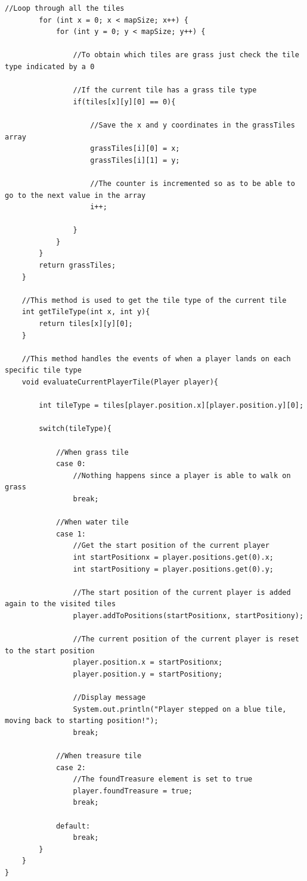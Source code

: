 \documentclass[a4paper,12pt]{extarticle}
\begin{document}
\begin{lstlisting}[caption=The initial code of the Map class]
        //Loop through all the tiles
        for (int x = 0; x < mapSize; x++) {
            for (int y = 0; y < mapSize; y++) {

                //To obtain which tiles are grass just check the tile type indicated by a 0

                //If the current tile has a grass tile type
                if(tiles[x][y][0] == 0){

                    //Save the x and y coordinates in the grassTiles array
                    grassTiles[i][0] = x;
                    grassTiles[i][1] = y;

                    //The counter is incremented so as to be able to go to the next value in the array
                    i++;

                }
            }
        }
        return grassTiles;
    }

    //This method is used to get the tile type of the current tile
    int getTileType(int x, int y){
        return tiles[x][y][0];
    }

    //This method handles the events of when a player lands on each specific tile type
    void evaluateCurrentPlayerTile(Player player){

        int tileType = tiles[player.position.x][player.position.y][0];

        switch(tileType){

            //When grass tile
            case 0:
                //Nothing happens since a player is able to walk on grass
                break;

            //When water tile
            case 1:
                //Get the start position of the current player
                int startPositionx = player.positions.get(0).x;
                int startPositiony = player.positions.get(0).y;

                //The start position of the current player is added again to the visited tiles
                player.addToPositions(startPositionx, startPositiony);

                //The current position of the current player is reset to the start position
                player.position.x = startPositionx;
                player.position.y = startPositiony;

                //Display message
                System.out.println("Player stepped on a blue tile, moving back to starting position!");
                break;

            //When treasure tile
            case 2:
                //The foundTreasure element is set to true
                player.foundTreasure = true;
                break;

            default:
                break;
        }
    }
}
\end{lstlisting}
\end{document}
